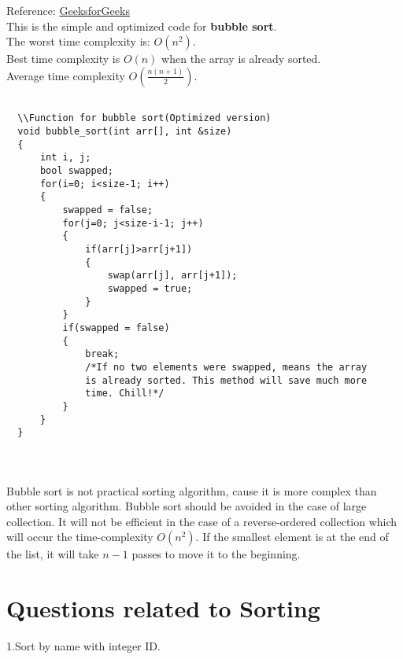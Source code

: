 \documentclass[11 pt]{article}
\begin{document}
Reference: \href{https://www.geeksforgeeks.org/bubble-sort/}{GeeksforGeeks}\\

 This is the simple and optimized code for \textcolor{blue!70}{\textbf{bubble sort}}.
 \\The worst time complexity is: $O(n^2)$.
 \\Best time complexity is $O(n)$ when the array is already sorted.
 \\Average time complexity $O\left(\frac{n(n+1)}{2}\right)$.
 \begin{lstlisting}[caption=Bubble sort, frame=TBRl]
 
  \\Function for bubble sort(Optimized version)
  void bubble_sort(int arr[], int &size)
  {
      int i, j;
      bool swapped;
      for(i=0; i<size-1; i++)
      {
          swapped = false;
          for(j=0; j<size-i-1; j++)
          {
              if(arr[j]>arr[j+1])
              {
                  swap(arr[j], arr[j+1]);
                  swapped = true;
              }
          }
          if(swapped = false)
          {
              break;
              /*If no two elements were swapped, means the array
              is already sorted. This method will save much more 
              time. Chill!*/
          }
      }
  }
 
 \end{lstlisting}
 
\section*{}
Bubble sort is not practical sorting algorithm, cause it is more complex than other sorting algorithm. Bubble sort should be avoided in the case of large collection. It will not be efficient in the case of a reverse-ordered collection which will occur the time-complexity $O(n^2)$.
If the smallest element is at the end of the list, it will take $n-1$ passes to move it to the beginning.

\section*{Questions related to Sorting}
1.Sort by name with integer ID.
\end{document}
